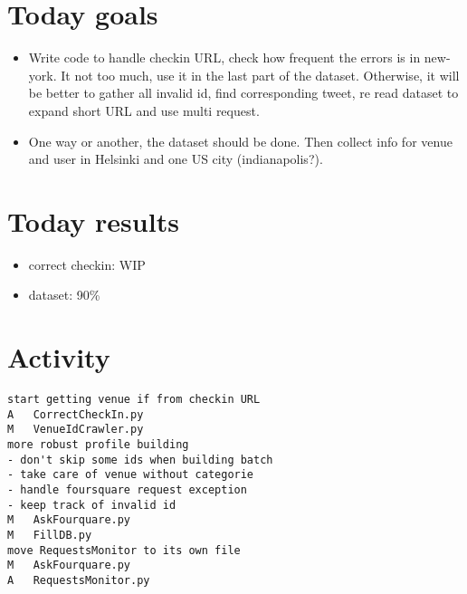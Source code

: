 \section*{Today goals}
\begin{itemize}
	\item Write code to handle checkin URL, check how frequent the errors is
		in new-york. It not too much, use it in the last part of the dataset.
		Otherwise, it will be better to gather all invalid id, find
		corresponding tweet, re read dataset to expand short URL and use multi
		request.
	\item One way or another, the dataset should be done. Then collect info for
		venue and user in Helsinki and one US city (indianapolis?).
\end{itemize}

\section*{Today results}
\begin{itemize}
	\item correct checkin: WIP
	\item dataset: 90\%
\end{itemize}

\section*{Activity}
\begin{verbatim}
start getting venue if from checkin URL
A	CorrectCheckIn.py
M	VenueIdCrawler.py
more robust profile building
- don't skip some ids when building batch
- take care of venue without categorie
- handle foursquare request exception
- keep track of invalid id
M	AskFourquare.py
M	FillDB.py
move RequestsMonitor to its own file
M	AskFourquare.py
A	RequestsMonitor.py
\end{verbatim}
